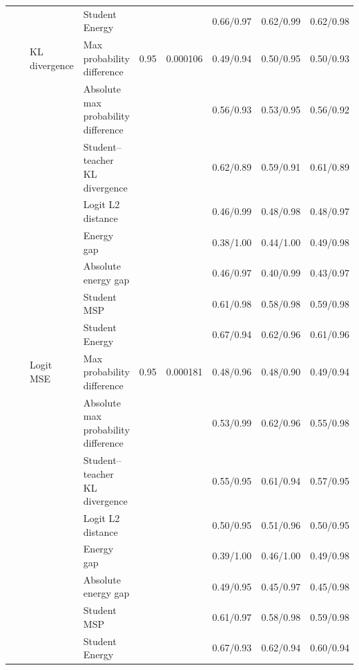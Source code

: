 \documentclass[border=2pt]{standalone}
\begin{document}
\begin{tabular}{llllccccc}
 &  &  & Student Energy &  &  & 0.66/0.97 & 0.62/0.99 & 0.62/0.98 \\
\addlinespace
 &  & KL divergence & Max probability difference & 0.95 & 0.000106 & 0.49/0.94 & 0.50/0.95 & 0.50/0.93 \\
 &  &  & Absolute max probability difference &  &  & 0.56/0.93 & 0.53/0.95 & 0.56/0.92 \\
 &  &  & Student--teacher KL divergence &  &  & 0.62/0.89 & 0.59/0.91 & 0.61/0.89 \\
 &  &  & Logit L2 distance &  &  & 0.46/0.99 & 0.48/0.98 & 0.48/0.97 \\
 &  &  & Energy gap &  &  & 0.38/1.00 & 0.44/1.00 & 0.49/0.98 \\
 &  &  & Absolute energy gap &  &  & 0.46/0.97 & 0.40/0.99 & 0.43/0.97 \\
 &  &  & Student MSP &  &  & 0.61/0.98 & 0.58/0.98 & 0.59/0.98 \\
 &  &  & Student Energy &  &  & 0.67/0.94 & 0.62/0.96 & 0.61/0.96 \\
\addlinespace
 &  & Logit MSE & Max probability difference & 0.95 & 0.000181 & 0.48/0.96 & 0.48/0.90 & 0.49/0.94 \\
 &  &  & Absolute max probability difference &  &  & 0.53/0.99 & 0.62/0.96 & 0.55/0.98 \\
 &  &  & Student--teacher KL divergence &  &  & 0.55/0.95 & 0.61/0.94 & 0.57/0.95 \\
 &  &  & Logit L2 distance &  &  & 0.50/0.95 & 0.51/0.96 & 0.50/0.95 \\
 &  &  & Energy gap &  &  & 0.39/1.00 & 0.46/1.00 & 0.49/0.98 \\
 &  &  & Absolute energy gap &  &  & 0.49/0.95 & 0.45/0.97 & 0.45/0.98 \\
 &  &  & Student MSP &  &  & 0.61/0.97 & 0.58/0.98 & 0.59/0.98 \\
 &  &  & Student Energy &  &  & 0.67/0.93 & 0.62/0.94 & 0.60/0.94 \\
\bottomrule
\end{tabular}
\end{document}
